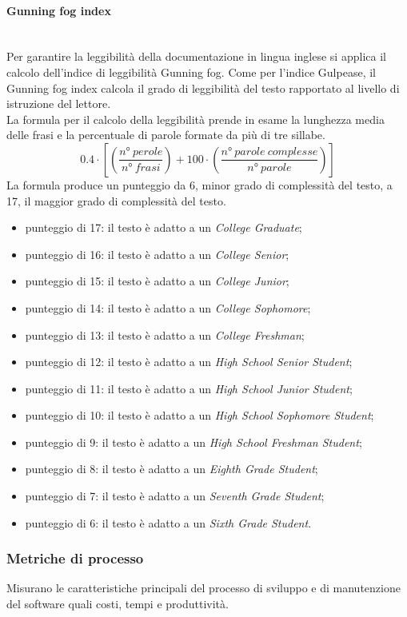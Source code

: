 \paragraph{Gunning fog index}\mbox{}\\
Per garantire la leggibilità della documentazione in lingua inglese si applica il calcolo dell'indice di leggibilità Gunning fog. Come per l’indice Gulpease, il Gunning fog index calcola il grado di leggibilità del testo rapportato al livello di istruzione del lettore.\\
La formula per il calcolo della leggibilità prende in esame la lunghezza media delle frasi e la percentuale di parole formate da più di tre sillabe.
\[ 0.4 \cdot \left[\left(\frac{n°\ perole}{n°\ frasi}\right)+100 \cdot \left(\frac{n°\ parole\ complesse}{n°\ parole}\right)\right] \]
La formula produce un punteggio da 6, minor grado di complessità del testo, a 17, il maggior grado di complessità del testo.
\begin{itemize}
	\item punteggio di 17: il testo è adatto a un \textit{College Graduate};
	\item punteggio di 16: il testo è adatto a un \textit{College Senior};
	\item punteggio di 15: il testo è adatto a un \textit{College Junior};
	\item punteggio di 14: il testo è adatto a un \textit{College Sophomore};
	\item punteggio di 13: il testo è adatto a un \textit{College Freshman};
	\item punteggio di 12: il testo è adatto a un \textit{High School Senior Student}; 
	\item punteggio di 11: il testo è adatto a un \textit{High School Junior Student};
	\item punteggio di 10: il testo è adatto a un \textit{High School Sophomore Student};
	\item punteggio di 9: il testo è adatto a un \textit{High School Freshman Student};
	\item punteggio di 8: il testo è adatto a un \textit{Eighth Grade Student};
	\item punteggio di 7: il testo è adatto a un \textit{Seventh Grade Student};
	\item punteggio di 6: il testo è adatto a un \textit{Sixth Grade Student}.
\end{itemize}

\subsubsection{Metriche di processo}
Misurano le caratteristiche principali del processo di sviluppo e di manutenzione del software quali costi, tempi e produttività.

